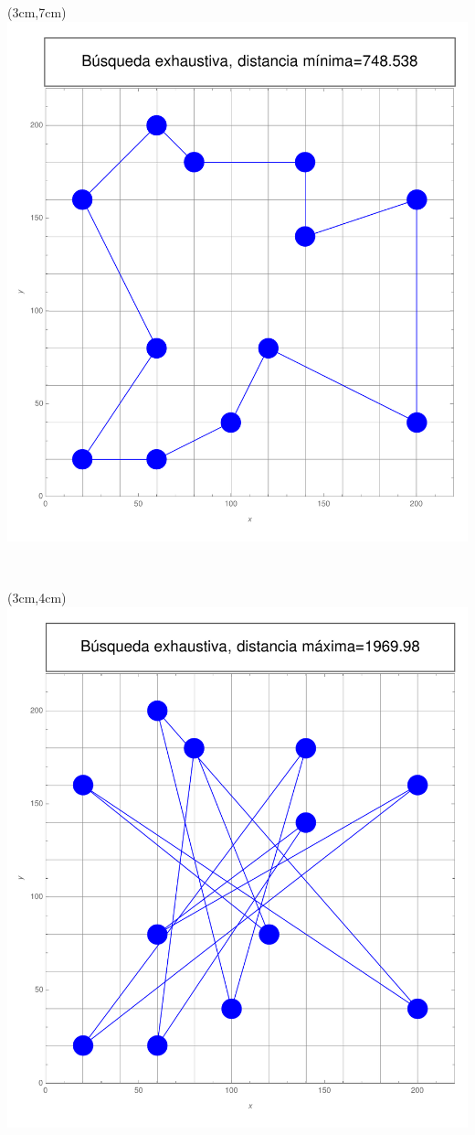 \documentclass[11pt, table]{report}
\begin{document}
{\begin{textblock*}{\textwidth}(3cm,7cm)
\includegraphics[scale=0.65]{Busqueda_exhaustiva_min.pdf}
\end{textblock*}

\

\pagebreak

\begin{textblock*}{\textwidth}(3cm,4cm)
\includegraphics[scale=0.65]{Busqueda_exhaustiva_max.pdf}
\end{textblock*}

}
\end{document}
